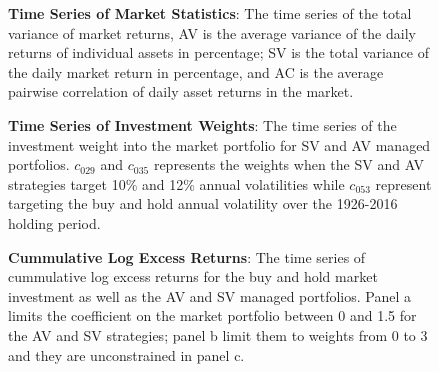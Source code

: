%		
\begin{landscape}
	\begin{figure}[!htb]
		\caption{{\bf Time Series of Market Statistics}: The time series of the total variance of market returns, AV is the average variance of the daily returns of individual assets in percentage; SV is the total variance of the daily market return in percentage, and AC is the average pairwise correlation of daily asset returns in the market.} \label{fig:time_series}
		
	\end{figure}
\end{landscape}
\clearpage
\begin{landscape}
	\begin{figure}[!htb]
		\caption{{\bf Time Series of Investment Weights}: The time series of the investment weight into the market portfolio for SV and AV managed portfolios. $c_{029}$ and $c_{035}$ represents the weights when the SV and AV strategies target 10\% and 12\% annual volatilities while $c_{053}$ represent targeting the buy and hold annual volatility over the 1926-2016 holding period.} \label{fig:weights_plot}
		
	\end{figure}
\end{landscape}
\clearpage
\begin{figure}[!htb]
		\caption{{\bf Cummulative Log Excess Returns}: The time series of cummulative log excess returns for the buy and hold market investment as well as the AV and SV managed portfolios. Panel a limits the coefficient on the market portfolio between 0 and 1.5 for the AV and SV strategies; panel b limit them to weights from 0 to 3 and they are unconstrained in panel c. } \label{fig:fig_returns}
		\vspace{-4mm}
		
\end{figure}
\clearpage
